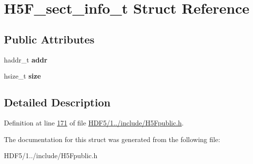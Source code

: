 \hypertarget{struct_h5_f__sect__info__t}{}\section{H5\+F\+\_\+sect\+\_\+info\+\_\+t Struct Reference}
\label{struct_h5_f__sect__info__t}
\subsection*{Public Attributes}
\begin{DoxyCompactItemize}
\item 
\mbox{\label{struct_h5_f__sect__info__t_ab6cb22af5aab6624547783e74f562df4}} 
haddr\+\_\+t {\bfseries addr}
\item 
\mbox{\label{struct_h5_f__sect__info__t_a80957040bfa23dcb66227b91de24c938}} 
hsize\+\_\+t {\bfseries size}
\end{DoxyCompactItemize}


\subsection{Detailed Description}


Definition at line \hyperlink{_h_d_f5_21_810_81_2include_2_h5_fpublic_8h_source_l00171}{171} of file \hyperlink{_h_d_f5_21_810_81_2include_2_h5_fpublic_8h_source}{H\+D\+F5/1../include/\+H5\+Fpublic.\+h}.



The documentation for this struct was generated from the following file\+:\begin{DoxyCompactItemize}
\item 
H\+D\+F5/1../include/\+H5\+Fpublic.\+h\end{DoxyCompactItemize}
